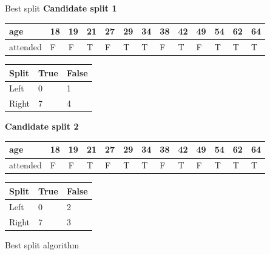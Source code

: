 \begin{frame}[fragile]{Best split}
    \textbf{Candidate split 1}
    \begin{tabular}{ll|lllllllllll}
    \toprule
    age & 18 & 19 & 21 & 27 & 29 & 34 & 38 & 42 & 49 & 54 & 62 & 64 \\
    \midrule
    attended &  F &  F &  T &  F &  T &  T &  F &  T &  F &  T &  T &  T \\
    \bottomrule
    \end{tabular}

    \begin{center}
        \begin{tabular}{lll}
        \toprule
        Split & True & False \\
        \hline
        \midrule
        Left & 0 & 1 \\
        Right & 7 & 4 \\
        \bottomrule
        \end{tabular}
    \end{center}


    \textbf{Candidate split 2}
    \begin{tabular}{lll|llllllllll}
    \toprule
    age & 18 & 19 & 21 & 27 & 29 & 34 & 38 & 42 & 49 & 54 & 62 & 64 \\
    \midrule
    attended &  F &  F &  T &  F &  T &  T &  F &  T &  F &  T &  T &  T \\
    \bottomrule
    \end{tabular}

    \begin{center}
        \begin{tabular}{lll}
        \toprule
        Split & True & False \\
        \hline
        \midrule
        Left & 0 & 2 \\
        Right & 7 & 3 \\
        \bottomrule
        \end{tabular}
    \end{center}

\end{frame}

\begin{frame}[fragile]{Best split algorithm}
    
\end{frame}

